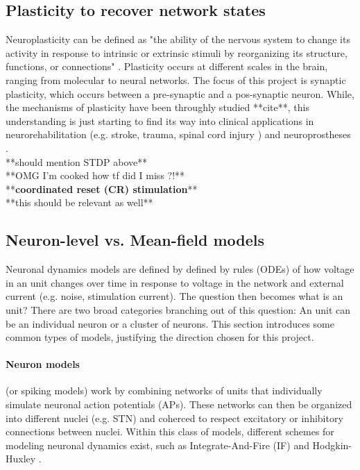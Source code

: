 \subsection{Plasticity to recover network states}
Neuroplasticity can be defined as "the ability of the nervous system to change its activity in
response to intrinsic or extrinsic stimuli by reorganizing its structure, functions, or
connections" \cite{mateos2019impact}.
Plasticity occurs at different scales in the brain, ranging from molecular to neural networks.
The focus of this project is synaptic plasticity, which occurs between a pre-synaptic and a
pos-synaptic neuron. While, the mechanisms of plasticity have been throughly studied **cite**,
this understanding is just starting to find its way into clinical applications in
neurorehabilitation (e.g. stroke, trauma, spinal cord injury \cite{cramer2011harnessing}) and
neuroprostheses \cite{lebedev2017brain}. \\
**should mention STDP above** \\
**OMG I'm cooked how tf did I miss \cite{hauptmann2009cumulative, hauptmann2010restoration}?!** \\
**\textbf{coordinated reset (CR) stimulation}** \\
**this should be relevant as well** \cite{schwab2020spike} \\

\subsection{Neuron-level vs. Mean-field models}
Neuronal dynamics models are defined by defined by rules (ODEs) of how voltage in an unit changes
over time in response to voltage in the network and external current (e.g. noise, stimulation
current).
The question then becomes what is an unit? There are two broad categories branching out of this
question: An unit can be an individual neuron or a cluster of neurons. This section introduces
some common types of models, justifying the direction chosen for this project.

\paragraph{Neuron models} (or spiking models) work by combining networks of units that individually
simulate neuronal action potentials (APs).
These networks can then be organized into different nuclei (e.g. STN) and coherced to respect
excitatory or inhibitory connections between nuclei.
Within this class of models, different schemes for modeling neuronal dynamics exist,
such as Integrate-And-Fire (IF) \cite{gerstner2014if} and Hodgkin-Huxley
\cite{hodgkin1952measurement, gerstner2014hh}.

